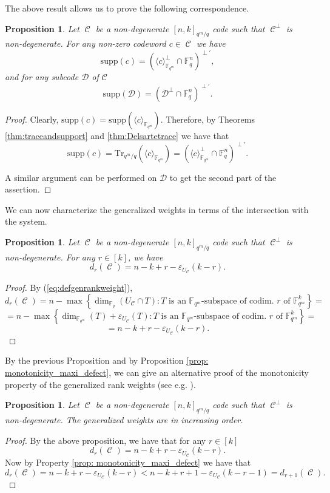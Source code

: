 \documentclass[11pt]{amsart}
\DeclareMathOperator{\C}{\mathcal{C}}
\newtheorem{proposition}[theorem]{Proposition}
\newcommand{\fqm}{\mathbb{F}_{q^m}}
\newcommand{\F}{{\mathbb F}}
\newcommand{\fq}{{\mathbb F}_{q}}
\begin{document}
The above result allows us to prove the following correspondence. 


\begin{proposition}\label{prop:suppgeometric}
    Let $\C$ be a non-degenerate $[n,k]_{q^m/q}$ code such that $\C^{\perp}$ is non-degenerate.
     For any non-zero codeword $c \in\C$ we have
     \[ \mathrm{supp}(c)=\left( \langle c\rangle_{\fqm}^\perp\cap \fq^n \right)^{\perp'}, \]
     and for any subcode $\mathcal{D}$ of $\mathcal{C}$
     \[ \mathrm{supp}(\mathcal{D})=\left( \mathcal{D}^\perp\cap \fq^n \right)^{\perp'}. \]
\end{proposition}
\begin{proof}
    Clearly, $\mathrm{supp}(c)=\mathrm{supp}(\langle c\rangle_{\F_{q^m}})$. Therefore, by Theorems \ref{thm:traceandsupport} and \ref{thm:Delsartetrace} we have that
    \[ \mathrm{supp}(c)=\mathrm{Tr}_{q^m/q}(\langle c\rangle_{\F_{q^m}})=(\langle c\rangle_{\F_{q^m}}^\perp\cap \fq^n)^{\perp'}. \]
   
    A similar argument can be performed on $\mathcal{D}$ to get the second part of the assertion.
\end{proof}

We can now characterize the generalized weights in terms of the intersection with the system.


\begin{proposition} \label{prop:gener_weight_maximum_defect}
    Let $\C$ be a non-degenerate $[n,k]_{q^m/q}$ code such that $\C^{\perp}$ is non-degenerate. 
    For any $r \in [k]$, we have
    \[ d_{r}(\C)=n-k+r-\varepsilon_{U_{\C}}(k-r).\]
\end{proposition}
\begin{proof}
    By (\ref{eq:defgenrankweight}),
    \[d_r(\C)=n - \max\left\{ \dim_{\fq}(U_{\C} \cap T)  \colon T\mbox{ is an } \F_{q^m}\mbox{-subspace of codim. $r$ of  }\F_{q^m}^k  \right\}=\]
   \[=n - \max\left\{ \dim_{\F_{q^m}}(T)+\varepsilon_{U_{\C}}(T) \colon T\mbox{ is an } \F_{q^m}\mbox{-subspace of codim. $r$ of  }\F_{q^m}^k  \right\}= \]
    \[=n -k+r- \varepsilon_{U_{\C}}(k-r) .\]
    
\end{proof}

By the previous Proposition and by Proposition \ref{prop: monotonicity_maxi_defect}, we can give an alternative proof of the monotonicity property of the generalized rank weights (see e.g. \cite[Theorem I.2]{ducoat2015generalized}). 

\begin{proposition}
    Let $\C$ be a non-degenerate $[n,k]_{q^m/q}$ code such that $\C^{\perp}$ is non-degenerate. 
    The generalized weights are in increasing order.
\end{proposition}
\begin{proof}
By the above proposition, we have that for any $r \in [k]$ 
\[ d_{r}(\C)=n-k+r-\varepsilon_{U_{\C}}(k-r).\]
Now by Property \ref{prop: monotonicity_maxi_defect} we have that 
\[d_r(\C)=n-k+r-\varepsilon_{U_{\C}}(k-r) < n-k+r+1-\varepsilon_{U_{\C}}(k-r-1)=d_{r+1}(\C).\]
\end{proof}
\end{document}
